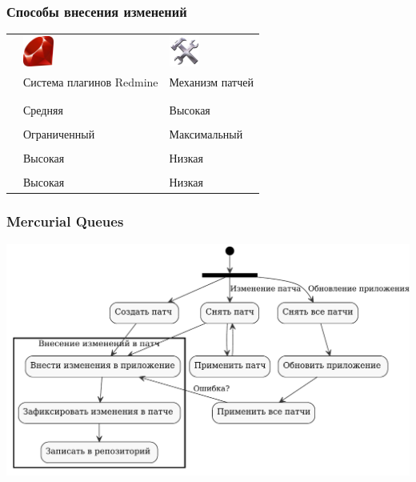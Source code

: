 \documentclass[unicode]{beamer}
\begin{document}
\begin{frame}
\transwipe[direction=90]
\frametitle{Способы внесения изменений}
\begin{tabular}{ >{\centering\arraybackslash}m{}  >{\centering\arraybackslash}m{}
>{\centering\arraybackslash}m{}}

&\includegraphics[width=1cm]{Ruby_logo.pdf}&\includegraphics[width=1cm]{patch-management.jpg}\\
\small
& Система плагинов Redmine & Механизм патчей\\
&&\\
\hline
&&\\
\color{blue}{Стоимость поддержки} & Средняя & Высокая \\
\hline
&&\\
\color{blue}{Спектр решаемых задач} & Ограниченный &  Максимальный\\
\hline
&&\\
\color{blue}{Сложность разработки} & Высокая & Низкая \\
\hline
&&\\
\color{blue}{Устойчивость к обновлениям системы} & Высокая & Низкая \\
\hline
\end{tabular}
\end{frame}

\begin{frame}
\transwipe[direction=90]
\frametitle{Mercurial Queues}
\centerline{\includegraphics[width=1\textwidth]{mq-workflow.pdf}}
\end{frame}
\end{document}
